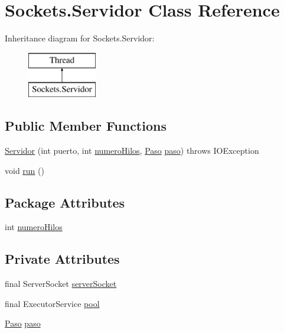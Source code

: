 \hypertarget{class_sockets_1_1_servidor}{}\section{Sockets.\+Servidor Class Reference}
\label{class_sockets_1_1_servidor}
Inheritance diagram for Sockets.\+Servidor\+:\begin{figure}[H]
\begin{center}
\leavevmode
\includegraphics[height=2.000000cm]{class_sockets_1_1_servidor}
\end{center}
\end{figure}
\subsection*{Public Member Functions}
\begin{DoxyCompactItemize}
\item 
\mbox{\hyperlink{class_sockets_1_1_servidor_a96cc7a6530e585d256ba5c381e04b3a6}{Servidor}} (int puerto, int \mbox{\hyperlink{class_sockets_1_1_servidor_a691693d40a5185891964aea68f2e01c7}{numero\+Hilos}}, \mbox{\hyperlink{class_sockets_1_1_paso}{Paso}} \mbox{\hyperlink{class_sockets_1_1_servidor_ae795e6902937973b50d977b2ed77b470}{paso}})  throws I\+O\+Exception 
\item 
void \mbox{\hyperlink{class_sockets_1_1_servidor_abd6e00143db2f9368f53083c427ad2b4}{run}} ()
\end{DoxyCompactItemize}
\subsection*{Package Attributes}
\begin{DoxyCompactItemize}
\item 
int \mbox{\hyperlink{class_sockets_1_1_servidor_a691693d40a5185891964aea68f2e01c7}{numero\+Hilos}}
\end{DoxyCompactItemize}
\subsection*{Private Attributes}
\begin{DoxyCompactItemize}
\item 
final Server\+Socket \mbox{\hyperlink{class_sockets_1_1_servidor_aa6eba116bcc543fa6b532894a6402957}{server\+Socket}}
\item 
final Executor\+Service \mbox{\hyperlink{class_sockets_1_1_servidor_a1a2e8bae5883a358083c35093a2a74b3}{pool}}
\item 
\mbox{\hyperlink{class_sockets_1_1_paso}{Paso}} \mbox{\hyperlink{class_sockets_1_1_servidor_ae795e6902937973b50d977b2ed77b470}{paso}}
\end{DoxyCompactItemize}


